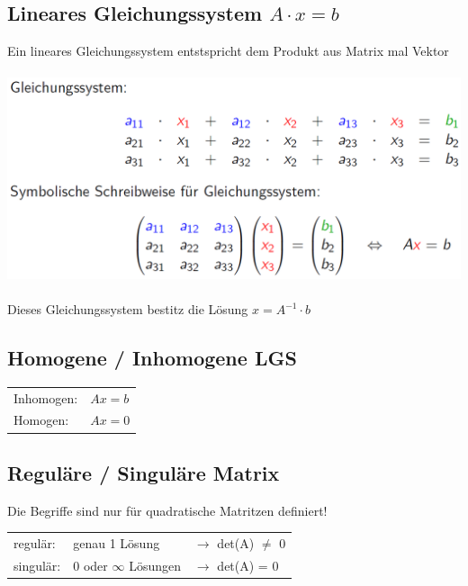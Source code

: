 			\subsection{Lineares Gleichungssystem $A \cdot x = b$}	
			Ein lineares Gleichungssystem entstspricht dem Produkt aus Matrix mal Vektor \\
			\\
			\includegraphics[width=0.8\linewidth]{Bilder/Ax_b} \\
			\\
			Dieses Gleichungssystem bestitz die Lösung $x = A^{-1} \cdot b$ \\	
				    
		    
		    
		    \subsection{Homogene / Inhomogene LGS}
		    \begin{tabular}{ll}
		    Inhomogen: & $Ax = b$ \\
		    Homogen: & $Ax = 0$ \\
		    \end{tabular}
		    
		    
		    
		    \subsection{Reguläre / Singuläre Matrix}
		    Die Begriffe sind nur für quadratische Matritzen definiert! \\
		    \begin{tabular}{lll}
		    regulär: & genau 1 Lösung & $\rightarrow$ det(A) $\neq$ 0 \\
		    singulär: & 0 oder $\infty$ Lösungen & $\rightarrow$ det(A) = 0 \\
		    \end{tabular}
		    
		    \vfill\null
		    \columnbreak
		    